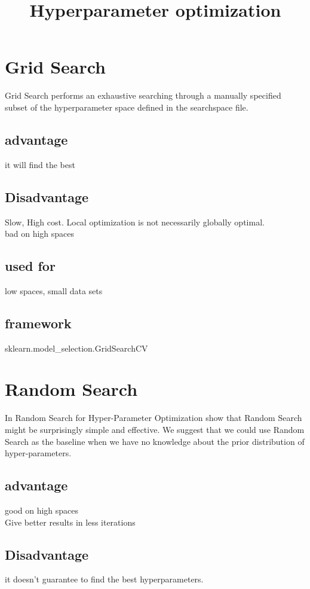 \documentclass[12pt]{article}
\title{Hyperparameter optimization}
\date{}
\begin{document}
	\maketitle
	
	
	\section{Grid Search}
	Grid Search performs an exhaustive searching through a manually specified subset of the hyperparameter space defined in the searchspace file. 
	
	\subsection{advantage}
	it will find the best
	\subsection{Disadvantage}
	Slow, High  cost.
	Local optimization is not necessarily globally optimal.\\
	bad on high spaces
	\subsection{used for}
	low spaces, small data sets
	\subsection{framework}
	sklearn.model{\_}selection.GridSearchCV
	
	
	\section{Random Search}
	In Random Search for Hyper-Parameter Optimization show that Random Search might be surprisingly simple and effective. We suggest that we could use Random Search as the baseline when we have no knowledge about the prior distribution of hyper-parameters. 
	
	\subsection{advantage}
	good on high spaces\\
	Give better results in less iterations
	\subsection{Disadvantage}
	it doesn't guarantee to find the best hyperparameters.
\end{document}
